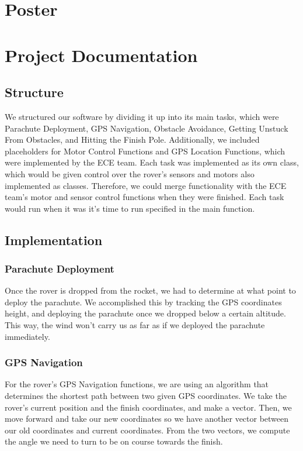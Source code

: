 \documentclass[10pt,letterpaper,onecolumn,draftclsnofoot,journal]{IEEEtran}
\begin{document}
\section{Poster}


\section{\textbf{Project Documentation}}
\subsection{\textbf{Structure}}
We structured our software by dividing it up into its main tasks, which were Parachute Deployment, GPS Navigation, Obstacle Avoidance, Getting Unstuck From Obstacles, and Hitting the Finish Pole. Additionally, we included placeholders for Motor Control Functions and GPS Location Functions, which were implemented by the ECE team. Each task was implemented as its own class, which would be given control over the rover's sensors and motors also implemented as classes. Therefore, we could merge functionality with the ECE team's motor and sensor control functions when they were finished. Each task would run when it was it's time to run specified in the main function.\vspace{.3cm}

\subsection{\textbf{Implementation}}
\subsubsection{\textbf{Parachute Deployment}}
Once the rover is dropped from the rocket, we had to determine at what point to deploy the parachute. We accomplished this by tracking the GPS coordinates height, and deploying the parachute once we dropped below a certain altitude. This way, the wind won’t carry us as far as if we deployed the parachute immediately.\vspace{.3cm}

\subsubsection{\textbf{GPS Navigation}}
For the rover’s GPS Navigation functions, we are using an algorithm that determines the shortest path between two given GPS coordinates. We take the rover's current position and the finish coordinates, and make a vector. Then, we move forward and take our new coordinates so we have another vector between our old coordinates and current coordinates. From the two vectors, we compute the angle we need to turn to be on course towards the finish.\vspace{.3cm}
\end{document}
